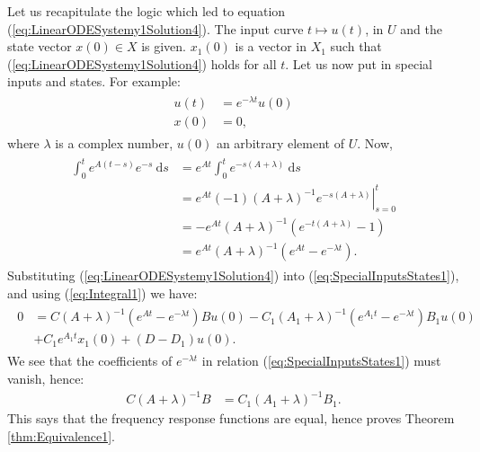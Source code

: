 \documentclass[12pt]{book}
\theoremstyle{plain}
\theoremstyle{definition}
\newcommand{\dd}[1]{\mathrm{d}#1}
\begin{document}
Let us recapitulate the logic which led to equation (\ref{eq:LinearODESystemy1Solution4}).
The input curve $t \mapsto u(t)$, in $U$ and the state vector $x(0) \in X$ is given.
$x_1(0)$ is a vector in $X_1$ such that (\ref{eq:LinearODESystemy1Solution4}) holds for all $t$.
Let us now put in special inputs and states.
For example:
\begin{align}
\begin{split} \label{eq:SpecialInputsStates1}
    u(t) &= e^{-\lambda t}u(0) \\
    x(0) &= 0,
\end{split}
\end{align}
where $\lambda$ is a complex number, $u(0)$ an arbitrary element of $U$.
Now,
\begin{align}
\begin{split} \label{eq:Integral1}
    \int_0^t e^{A(t-s)}e^{-s}\ \dd{s} &= e^{At}\int_0^t e^{-s(A+\lambda)}\ \dd{s} \\
    &= \left.e^{At}(-1)(A+\lambda)^{-1}e^{-s(A+\lambda)}\right|_{s=0}^t \\
    &= -e^{At}(A+\lambda)^{-1}(e^{-t(A+\lambda)} - 1) \\
    &= e^{At}(A+\lambda)^{-1}(e^{At}-e^{-\lambda t}).
\end{split}
\end{align}
Substituting (\ref{eq:LinearODESystemy1Solution4}) into (\ref{eq:SpecialInputsStates1}), and using (\ref{eq:Integral1}) we have:
\begin{align}
\begin{split}
    0 &= C(A+\lambda)^{-1}(e^{At}-e^{-\lambda t})Bu(0) - C_1(A_1+\lambda)^{-1}(e^{A_1t}-e^{-\lambda t})B_1u(0) \\
    &+ C_1e^{A_1t}x_1(0) + (D-D_1)u(0).
\end{split}
\end{align}
We see that the coefficients of $e^{-\lambda t}$ in relation (\ref{eq:SpecialInputsStates1}) must vanish, hence:
\begin{align}
    C(A+\lambda)^{-1}B &= C_1(A_1+\lambda)^{-1}B_1.
\end{align}
This says that the frequency response functions are equal, hence proves Theorem \ref{thm:Equivalence1}.
\end{document}
